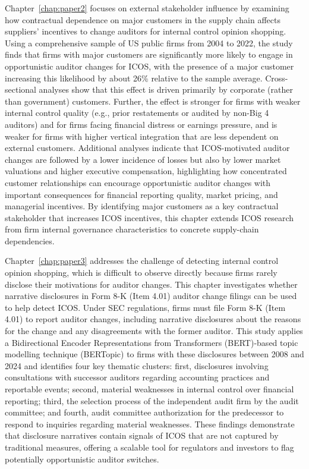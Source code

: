 \documentclass[12pt, a4paper]{report}
\begin{document}
Chapter~\ref{chap:paper2} focuses on external stakeholder influence by examining how contractual dependence on major customers in the supply chain affects suppliers’ incentives to change auditors for internal control opinion shopping. Using a comprehensive sample of US public firms from 2004 to 2022, the study finds that firms with major customers are significantly more likely to engage in opportunistic auditor changes for ICOS, with the presence of a major customer increasing this likelihood by about 26\% relative to the sample average. Cross-sectional analyses show that this effect is driven primarily by corporate (rather than government) customers. Further, the effect is stronger for firms with weaker internal control quality (e.g., prior restatements or audited by non-Big 4 auditors) and for firms facing financial distress or earnings pressure, and is weaker for firms with higher vertical integration that are less dependent on external customers. Additional analyses indicate that ICOS-motivated auditor changes are followed by a lower incidence of losses but also by lower market valuations and higher executive compensation, highlighting how concentrated customer relationships can encourage opportunistic auditor changes with important consequences for financial reporting quality, market pricing, and managerial incentives. By identifying major customers as a key contractual stakeholder that increases ICOS incentives, this chapter extends ICOS research from firm internal governance characteristics to concrete supply-chain dependencies.

Chapter~\ref{chap:paper3} addresses the challenge of detecting internal control opinion shopping, which is difficult to observe directly because firms rarely disclose their motivations for auditor changes. This chapter investigates whether narrative disclosures in Form 8-K (Item 4.01) auditor change filings can be used to help detect ICOS. Under SEC regulations, firms must file Form 8-K (Item 4.01) to report auditor changes, including narrative disclosures about the reasons for the change and any disagreements with the former auditor. This study applies a Bidirectional Encoder Representations from Transformers (BERT)-based topic modelling technique (BERTopic) to firms with these disclosures between 2008 and 2024\label{viva:c1-sample} and identifies four key thematic clusters: first, disclosures involving consultations with successor auditors regarding accounting practices and reportable events; second, material weaknesses in internal control over financial reporting; third, the selection process of the independent audit firm by the audit committee; and fourth, audit committee authorization for the predecessor to respond to inquiries regarding material weaknesses. These findings demonstrate that disclosure narratives contain signals of ICOS that are not captured by traditional measures, offering a scalable tool for regulators and investors to flag potentially opportunistic auditor switches.
\end{document}
